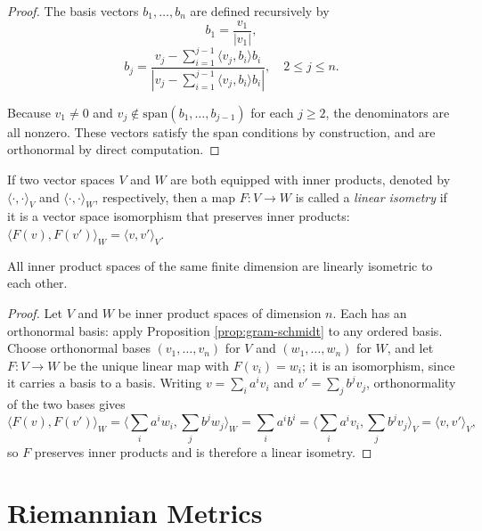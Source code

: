 \begin{proof}
\leanok
The basis vectors $b_1,\ldots,b_n$ are defined recursively by
$$b_1 = \frac{v_1}{|v_1|},$$
$$b_j = \frac{v_j - \sum_{i=1}^{j-1}\langle v_j, b_i \rangle b_i}{\left|v_j - \sum_{i=1}^{j-1}\langle v_j, b_i \rangle b_i\right|}, \quad 2 \le j \le n.$$

Because $v_1 \ne 0$ and $v_j \notin \text{span}(b_1,\ldots,b_{j-1})$ for each $j \ge 2$, the denominators are all nonzero. These vectors satisfy the span conditions by construction, and are orthonormal by direct computation.
\end{proof}

If two vector spaces $V$ and $W$ are both equipped with inner products, denoted by $\langle \cdot, \cdot \rangle_V$ and $\langle \cdot, \cdot \rangle_W$, respectively, then a map $F : V \to W$ is called a \emph{linear isometry} if it is a vector space isomorphism that preserves inner products: $\langle F(v), F(v') \rangle_W = \langle v, v' \rangle_V$.

\begin{proposition}
\label{prop:inner-product-spaces-linearly-isometric}
\leanok
{}
All inner product spaces of the same finite dimension are linearly isometric to each other.
\end{proposition}

\begin{proof}
\leanok
Let $V$ and $W$ be inner product spaces of dimension $n$. Each has an orthonormal basis: apply Proposition \ref{prop:gram-schmidt} to any ordered basis. Choose orthonormal bases $(v_1,\ldots,v_n)$ for $V$ and $(w_1,\ldots,w_n)$ for $W$, and let $F : V \to W$ be the unique linear map with $F(v_i) = w_i$; it is an isomorphism, since it carries a basis to a basis. Writing $v = \sum_i a^i v_i$ and $v' = \sum_j b^j v_j$, orthonormality of the two bases gives
\[
\langle F(v), F(v') \rangle_W = \Big\langle \sum_i a^i w_i, \sum_j b^j w_j \Big\rangle_W = \sum_i a^i b^i = \Big\langle \sum_i a^i v_i, \sum_j b^j v_j \Big\rangle_V = \langle v, v' \rangle_V ,
\]
so $F$ preserves inner products and is therefore a linear isometry.
\end{proof}

\section{Riemannian Metrics}

